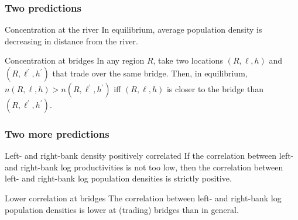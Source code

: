 \documentclass[compress,mathserif]{beamer}
\begin{document}
\begin{frame}%

\frametitle{Two predictions}

\begin{block}{Concentration at the river}
In equilibrium, average population density is decreasing in distance from
the river.%
\end{block}%

\begin{block}{Concentration at bridges}%
In any region $R$, take two locations $\left( R,\ell ,h\right) $ and $\left(
R,\ell ^{\prime },h^{\prime }\right) $ that trade over the same bridge.
Then, in equilibrium, $n\left( R,\ell ,h\right) >n\left( R,\ell ^{\prime
},h^{\prime }\right) $ iff $\left( R,\ell ,h\right) $ is closer to the
bridge than $\left( R,\ell ^{\prime },h^{\prime }\right) $.%
\end{block}%

\end{frame}%
\begin{frame}%

\frametitle{Two more predictions}

\begin{block}{Left- and right-bank density positively correlated}%
If the correlation between left- and right-bank log productivities is not
too low, then the correlation between left- and right-bank log population
densities is strictly positive.%
\end{block}%

\begin{block}{Lower correlation at bridges}%
The correlation between left- and right-bank log population densities is
lower at (trading) bridges than in general.%
\end{block}%

\end{frame}%
\end{document}
